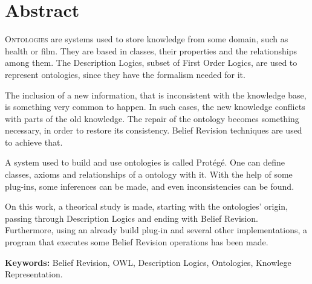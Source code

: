 \chapter*{Abstract}

\lettrine{O}{ntologies} are systems used to store knowledge from some domain, such as health or film. They are based in classes, their properties and the relationships among them. The Description Logics, subset of First Order Logics, are used to represent ontologies, since they have the formalism needed for it.

The inclusion of a new information, that is inconsistent with the knowledge base, is something very common to happen. In such cases, the new knowledge conflicts with parts of the old knowledge. The repair of the ontology becomes something necessary, in order to restore its consistency. Belief Revision techniques are used to achieve that.

A system used to build and use ontologies is called Protégé. One can define classes, axioms and relationships of a ontology with it. With the help of some plug-ins, some inferences can be made, and even inconsistencies can be found.

On this work, a theorical study is made, starting with the ontologies' origin, passing through Description Logics and ending with Belief Revision. Furthermore, using an already build plug-in and several other implementations, a program that executes some Belief Revision operations has been made.

\noindent \textbf{Keywords:} Belief Revision, OWL, Description Logics, Ontologies, Knowlege Representation.